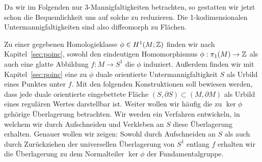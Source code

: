 Da wir im Folgenden nur 3-Mannigfaltigkeiten betrachten, so gestatten wir jetzt schon die Bequemlichkeit uns auf solche zu reduzieren. Die 1-kodimensionalen Untermannigfaltigkeiten sind also diffeomorph zu Flächen.

\label{sec:constr}
Zu einer gegebenen Homologieklasse $  \phi \in H^1(M;\mathbb{Z})$ finden wir nach Kapitel~\ref{sec:poinc}, sowohl den eindeutigen Homomorphismus $\phi:\pi_1(M) \to \mathbb{Z}$ als auch eine glatte Abbildung $f:M \to S^1$ die $\phi$ induziert. Außerdem finden wir mit Kapitel~\ref{sec:poinc} eine zu $ \phi$ duale orientierte Untermannigfaltigkeit $S$ als Urbild eines Punktes unter $f$. Mit den folgenden Konstruktionen soll bewiesen werden, dass jede duale orientierte eingebettete Fläche $(S,\partial S) \subset (M,\partial M)$ als Urbild eines regulären Wertes darstellbar ist. Weiter wollen wir häufig die zu $\ker \phi$ gehörige Überlagerung betrachten. Wir werden ein Verfahren entwickeln, in welchem wir durch Aufschneiden und Verkleben an $S$ diese Überlagerung erhalten. Genauer wollen wir zeigen: Sowohl durch Aufschneiden an $S$ als auch durch Zurückziehen der universellen Überlagerung von $S^1$ entlang $f$ erhalten wir die Überlagerung zu dem Normalteiler $\ker\phi$ der Fundamentalgruppe.

